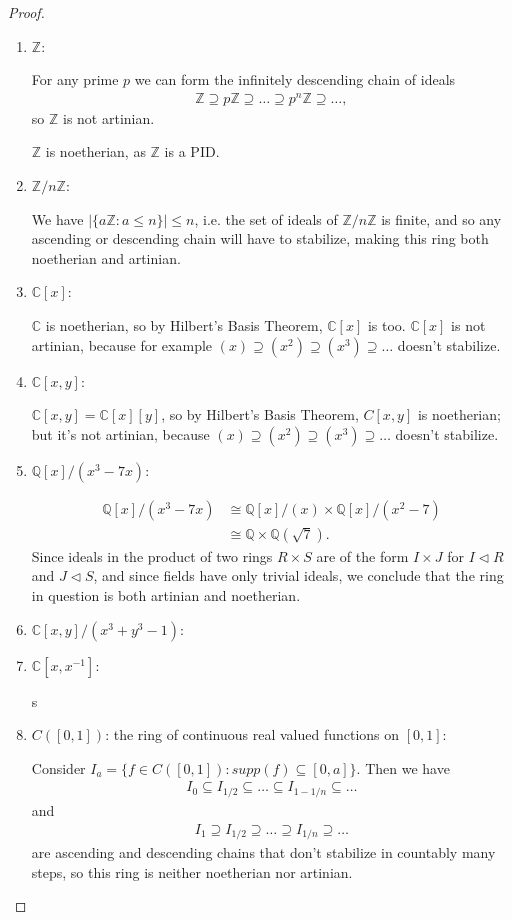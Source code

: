 \documentclass[12pt]{extarticle}
\newcommand{\abs}[1]{|#1|}
\newcommand{\set}[1]{\{#1\}}
\newcommand{\C}{\mathbb{C}}
\newcommand{\Q}{\mathbb{Q}}
\newcommand{\Z}{\mathbb{Z}}
\newcommand{\<}{\langle}
\newcommand{\ideal}{\triangleleft}
\renewcommand{\>}{\rangle}
\theoremstyle{definition}
\begin{document}
\begin{proof}
  \begin{enumerate}
  \item $\Z$:
    
    For any prime $p$ we can form the infinitely descending chain of ideals
    \begin{align*}
      \Z \supseteq p\Z \supseteq \dots \supseteq p^n\Z \supseteq \dots,
    \end{align*}
    so $\Z$ is not artinian.

    $\Z$ is noetherian, as $\Z$ is a PID.
  \item
    $\Z/n\Z$:

    We have $\abs{\set{a\Z: a \leq n}} \leq n$, i.e. the set of ideals of $\Z/n\Z$ is finite, and so any ascending or descending chain will have to stabilize, making this ring both noetherian and artinian. 
  \item
    $\C[x]$:

    $\C$ is noetherian, so by Hilbert's Basis Theorem, $\C[x]$ is too. $\C[x]$ is not artinian, because for example $(x) \supseteq (x^2) \supseteq (x^3) \supseteq \dots $ doesn't stabilize.
  \item
    $\C[x,y]$:

    $\C[x,y] = \C[x][y]$, so by Hilbert's Basis Theorem, $C[x,y]$ is noetherian; but it's not artinian, because $(x) \supseteq (x^2) \supseteq (x^3) \supseteq \dots $ doesn't stabilize.
  \item
    $\Q[x]/(x^3-7x)$:

    \begin{align*}
      \Q[x]/(x^3-7x) &\cong \Q[x]/(x) \times \Q[x]/(x^2-7) \\
      &\cong \Q \times \Q(\sqrt{7}).
    \end{align*}
    Since ideals in the product of two rings $R \times S$ are of the form $I \times J$ for $I \ideal R$ and $J \ideal S$, and since fields have only trivial ideals, we conclude that the ring in question is both artinian and noetherian.

  \item
    $\C[x,y]/(x^3+y^3-1)$:

    
  \item
    $\C[x,x^{-1}]$:

 s  \item
    $C([0,1])$: the ring of continuous real valued functions on $[0,1]$:

    Consider $I_a = \set{f \in C([0,1]): supp(f) \subseteq [0,a]}$. Then we have
    \begin{align*}
      I_{0} \subseteq I_{1/2} \subseteq \dots \subseteq I_{1-1/n} \subseteq \dots 
    \end{align*}
    and
    \begin{align*}
      I_{1} \supseteq I_{1/2} \supseteq \dots \supseteq I_{1/n} \supseteq \dots 
    \end{align*}
    are ascending and descending chains that don't stabilize in countably many steps, so this ring is neither noetherian nor artinian.


\end{enumerate}
\end{proof}
\end{document}
